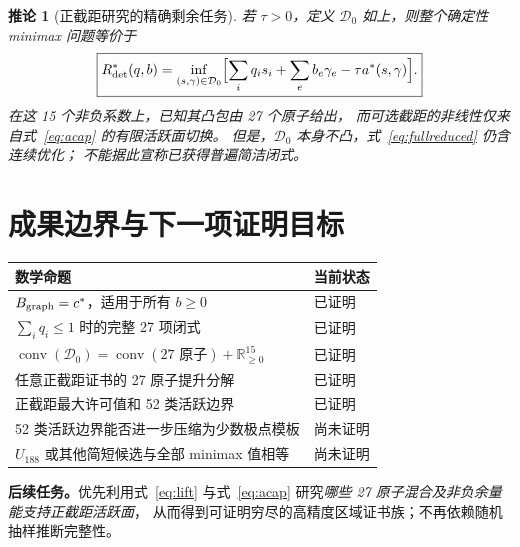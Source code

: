 \documentclass[11pt,a4paper]{ctexart}
\newtheorem{corollary}[theorem]{推论}
\theoremstyle{remark}
\newcommand{\Rstar}{R^*_{\rm det}}
\newcommand{\N}{\mathbb R_{\ge0}}
\begin{document}
\begin{corollary}[正截距研究的精确剩余任务]
若 $\tau>0$，定义 $\mathcal D_0$ 如上，则整个确定性 minimax 问题等价于
\begin{equation}\label{eq:fullreduced}
\boxed{
\Rstar(q,b)=\inf_{(s,\gamma)\in\mathcal D_0}
\Bigl[\sum_iq_is_i+\sum_eb_e\gamma_e-\tau a^*(s,\gamma)\Bigr].
}
\end{equation}
在这 15 个非负系数上，已知其\emph{凸包}由 27 个原子给出，
而可选截距的非线性仅来自式~\eqref{eq:acap} 的有限活跃面切换。
但是，$\mathcal D_0$ 本身不凸，式~\eqref{eq:fullreduced} 仍含连续优化；
不能据此宣称已获得普遍简洁闭式。
\end{corollary}

\section{成果边界与下一项证明目标}
\begin{center}
\begin{tabular}{p{.70\linewidth}p{.22\linewidth}}
\toprule
数学命题 & 当前状态\\ \midrule
$B_{\rm graph}=c^*$，适用于所有 $b\ge0$ & 已证明\\
$\sum_iq_i\le1$ 时的完整 27 项闭式 & 已证明\\
$\operatorname{conv}(\mathcal D_0)=\operatorname{conv}(27\text{ 原子})+\N^{15}$ & 已证明\\
任意正截距证书的 27 原子提升分解 & 已证明\\
正截距最大许可值和 52 类活跃边界 & 已证明\\
52 类活跃边界能否进一步压缩为少数极点模板 & 尚未证明\\
$U_{188}$ 或其他简短候选与全部 minimax 值相等 & 尚未证明\\
\bottomrule
\end{tabular}
\end{center}
\noindent\textbf{后续任务。}优先利用式~\eqref{eq:lift} 与式~\eqref{eq:acap}
研究\emph{哪些 27 原子混合及非负余量能支持正截距活跃面}，
从而得到可证明穷尽的高精度区域证书族；不再依赖随机抽样推断完整性。

\appendix
\end{document}
